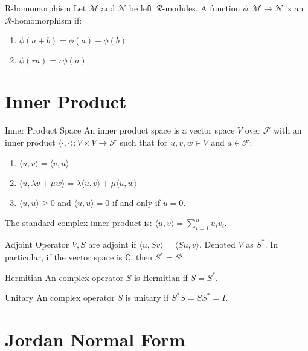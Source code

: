 \documentclass[12pt, a4paper]{article}
\theoremstyle{remark}
\newcommand{\bb}[1]{\mathbb{#1}}
\newcommand{\mc}[1]{\mathcal{#1}}
\begin{document}
\begin{definition}{R-homomorphism}{}
	Let $\mc{M}$ and $\mc{N}$ be left $\mc{R}$-modules. A function $\phi: \mc{M} \to \mc{N}$ is an $\mc{R}$-homomorphism if:
	\begin{enumerate}
		\item $\phi(a+b) = \phi(a) + \phi(b)$
		\item $\phi(ra) = r\phi(a)$
	\end{enumerate}
\end{definition}

\section{Inner Product}
\begin{definition}{Inner Product Space}{}
	An inner product space is a vector space $V$ over $\mc{F}$ with an inner product $\langle \cdot, \cdot \rangle: V \times V \to \mc{F}$ such that for $u, v, w \in V$ and $a \in \mc{F}$:
	\begin{enumerate}
		\item $\langle u, v \rangle = \overline{\langle v, u \rangle}$
		\item $\langle u, \lambda v + \mu w \rangle = \lambda \langle u, v \rangle + \overline{\mu} \langle u, w \rangle$
		\item $\langle u, u \rangle \geq 0$ and $\langle u, u \rangle = 0$ if and only if $u = 0$.
	\end{enumerate}

	The standard complex inner product is: $\langle u, v \rangle = \sum_{i=1}^n u_i \overline{v_i}$.
\end{definition}

\begin{definition}{Adjoint}{}
	Operator $V, S$ are adjoint if $\langle u, Sv \rangle = \langle Su, v \rangle$. Denoted $V$ as $S^*$.
	In particular, if the vector space is $\bb{C}$, then $S^* = \overline{S^T}$.
\end{definition}

\begin{definition}{Hermitian}{}
	An complex operator $S$ is Hermitian if $S = S^*$.
\end{definition}

\begin{definition}{Unitary}{}
	An complex operator $S$ is unitary if $S^*S = SS^* = I$.
\end{definition}

\section{Jordan Normal Form}
\end{document}
